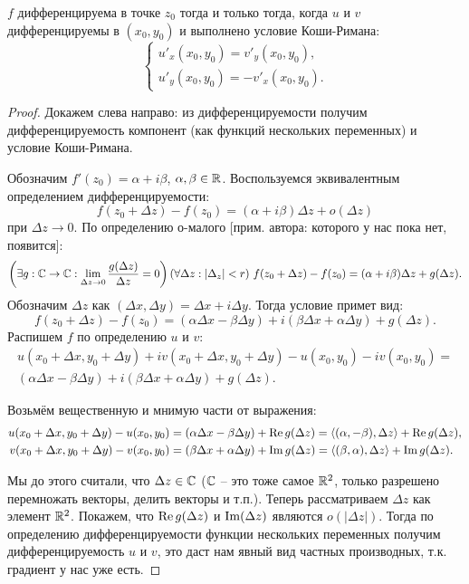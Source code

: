 \begin{theorem}
	$f$ дифференцируема в точке $z_0$ тогда и только тогда, когда $u$ и $v$ дифференцируемы в $(x_0, y_0)$ и выполнено условие Коши-Римана:
	\[
		\begin{cases}
			{u'}_x(x_0, y_0) = {v'}_y(x_0, y_0), \\
			{u'}_y(x_0, y_0) = -{v'}_x(x_0, y_0).
		\end{cases}
	\]
\end{theorem}
\begin{proof}	
	Докажем слева направо: из дифференцируемости получим дифференцируемость компонент (как функций нескольких переменных) и условие Коши-Римана.
	
	Обозначим $f'(z_0) = \alpha + i \beta$, $\alpha, \beta \in \mathbb{R}$.
	Воспользуемся эквивалентным определением дифференцируемости:
	\[
		f(z_0 + \Delta z) - f(z_0) = (\alpha + i \beta) \Delta z + o(\Delta z)
	\]
	при $\Delta z \to 0$. По определению о-малого [прим. автора: которого у нас пока нет, появится]:
	\[
		\left( \exists g: \mathbb{C} \to \mathbb{C}: \lim_{\Delta z \to 0} \frac{g(\Delta z)}{\Delta z} = 0 \right) (\forall \Delta z : \lvert \Delta_z \rvert < r) \,\, f(z_0 + \Delta z) - f(z_0) = (\alpha + i \beta) \Delta z + g(\Delta z).
	\]
	Обозначим $\Delta z$ как $(\Delta x, \Delta y) = \Delta x + i \Delta y$. Тогда условие примет вид: \\
	\[
		f(z_0 + \Delta z) - f(z_0) = (\alpha \Delta x - \beta \Delta y) + i (\beta \Delta x + \alpha \Delta y) + g(\Delta z).
	\]
	Распишем $f$ по определению $u$ и $v$:
	\begin{align*}
		u(x_0 + \Delta x, y_0 + \Delta y) + i v(x_0 + \Delta x, y_0 + \Delta y) - 	u(x_0, y_0) - i v(x_0, y_0) = \\
		(\alpha \Delta x - \beta \Delta y) + i (\beta \Delta x + \alpha \Delta y) + g(\Delta z).
	\end{align*}

	Возьмём вещественную и мнимую части от выражения:
	\begin{align*}
		u(x_0 + \Delta x, y_0 + \Delta y) - u(x_0, y_0) &= (\alpha \Delta x - \beta \Delta y) + \operatorname{Re} g(\Delta z) = \langle (\alpha, -\beta), \Delta z \rangle + \operatorname{Re} g(\Delta z), \\
		v(x_0 + \Delta x, y_0 + \Delta y) - v(x_0, y_0) &= (\beta \Delta x + \alpha \Delta y) + \operatorname{Im} g(\Delta z) = \langle (\beta, \alpha), \Delta z \rangle + \operatorname{Im} g(\Delta z).
	\end{align*}

	Мы до этого считали, что $\Delta z \in \mathbb{C}$ ($\mathbb{C}$ -- это тоже самое $\mathbb{R}^2$, только разрешено перемножать векторы, делить векторы и т.п.). Теперь рассматриваем $\Delta z$ как элемент $\mathbb{R}^2$.
	Покажем, что $\operatorname{Re} g(\Delta z)$ и $\operatorname{Im} (\Delta z)$ являются $o(\lvert \Delta z \rvert)$. Тогда по определению дифференцируемости функции нескольких переменных получим дифференцируемость $u$ и $v$, это даст нам явный вид частных производных, т.к. градиент у нас уже есть.
	

\end{proof}
